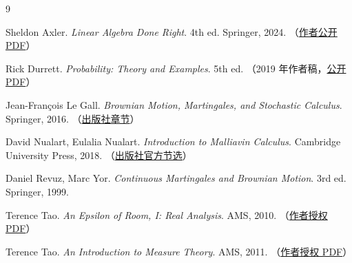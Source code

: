 \documentclass[UTF8,11pt,a4paper,oneside,fontset=fandol]{ctexrep}
\numberwithin{equation}{section}
\theoremstyle{zhthm}
\begin{document}
\begin{thebibliography}{9}

Sheldon Axler. \emph{Linear Algebra Done Right}. 4th ed. Springer, 2024.
（\href{https://linear.axler.net/LADR4e.pdf}{作者公开 PDF}）

Rick Durrett. \emph{Probability: Theory and Examples}. 5th ed.
（2019 年作者稿，\href{https://sites.math.duke.edu/~rtd/PTE/PTE5_011119.pdf}{公开 PDF}）

Jean-Fran\c{c}ois Le Gall. \emph{Brownian Motion, Martingales, and Stochastic Calculus}. Springer, 2016.
（\href{https://link.springer.com/chapter/10.1007/978-3-319-31089-3_1}{出版社章节}）

David Nualart, Eulalia Nualart. \emph{Introduction to Malliavin Calculus}. Cambridge University Press, 2018.
（\href{https://assets.cambridge.org/97811076/11986/excerpt/9781107611986_excerpt.pdf}{出版社官方节选}）

Daniel Revuz, Marc Yor. \emph{Continuous Martingales and Brownian Motion}. 3rd ed. Springer, 1999.

Terence Tao. \emph{An Epsilon of Room, I: Real Analysis}. AMS, 2010.
（\href{https://terrytao.wordpress.com/wp-content/uploads/2012/12/gsm-117-tao3-epsilon1.pdf}{作者授权 PDF}）

Terence Tao. \emph{An Introduction to Measure Theory}. AMS, 2011.
（\href{https://terrytao.wordpress.com/wp-content/uploads/2012/12/gsm-126-tao5-measure-book.pdf}{作者授权 PDF}）

\end{thebibliography}
\end{document}
